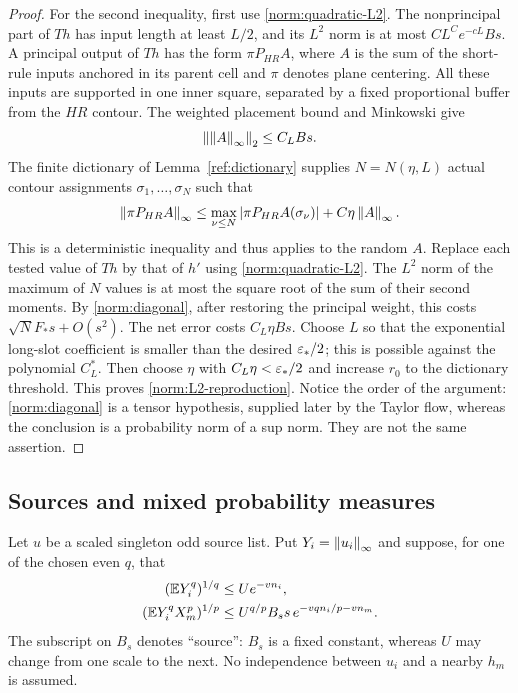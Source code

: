 \begin{proof}
For the second inequality, first use \eqref{norm:quadratic-L2}.
The nonprincipal part of $Th$ has input length at least $L/2$, and its
$L^2$ norm is at most $CL^Ce^{-cL} Bs$.  A principal output of $Th$
has the form $\pi P_{HR}A$, where $A$ is the sum of the short-rule
inputs anchored in its parent cell and $\pi$ denotes plane centering.
All these inputs are supported in one inner square, separated by a
fixed proportional buffer from the $HR$ contour.  The weighted
placement bound and Minkowski give
\[
                     \left\lVert\left\lVert A\right\rVert_\infty\right\rVert_2\le C_L Bs.
\]
The finite dictionary of Lemma~\ref{ref:dictionary} supplies $N=N(\eta,L)$
actual contour assignments $\sigma_1,\ldots,\sigma_N$ such that
\[
 \left\lVert\pi P_{HR}A\right\rVert_\infty
 \le \max_{\nu\le N}|\pi P_{HR}A(\sigma_\nu)|
                          +C\eta\left\lVert A\right\rVert_\infty.
\]
This is a deterministic inequality and thus applies to the random $A$.
Replace each tested value of $Th$ by that of $h'$ using
\eqref{norm:quadratic-L2}.  The $L^2$ norm of the maximum of $N$ values
is at most the square root of the sum of their second moments.  By
\eqref{norm:diagonal}, after restoring the principal weight, this costs
$\sqrt N F_*s+O(s^2)$.  The net error costs $C_L\eta Bs$.
Choose $L$ so that the exponential long-slot coefficient is smaller
than the desired $\varepsilon_*/2$; this is possible against the polynomial
$C_L^*$.  Then choose $\eta$ with $C_L\eta<\varepsilon_*/2$ and increase
$r_0$ to the dictionary threshold.  This proves
\eqref{norm:L2-reproduction}.  Notice the order of the argument:
\eqref{norm:diagonal} is a tensor hypothesis, supplied later by the
Taylor flow, whereas the conclusion is a probability norm of a sup
norm.  They are not the same assertion.
\end{proof}

\subsection{Sources and mixed probability measures}
Let $u$ be a scaled singleton odd source list.  Put $Y_i=\left\lVert u_i\right\rVert_\infty$
and suppose, for one of the chosen even $q$, that
\begin{align}
 (\mathbb E Y_i^q)^{1/q}&\le Ue^{-vn_i},\label{norm:source-input}\\
 (\mathbb E Y_i^qX_m^p)^{1/p}
  &\le U^{q/p}B_s s\,e^{-vq n_i/p-vn_m}.
                                      \label{norm:mixed-input}
\end{align}
The subscript on $B_s$ denotes ``source'': $B_s$ is a fixed constant,
whereas $U$ may change from one scale to the next.  No independence
between $u_i$ and a nearby $h_m$ is assumed.

